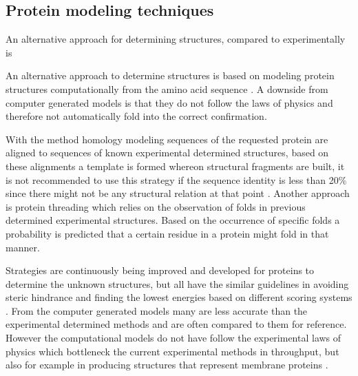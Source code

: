 \subsection{Protein modeling techniques}
An alternative approach for determining structures, compared to experimentally is  

An alternative approach to determine structures is based on modeling protein structures computationally from the amino acid sequence . A downside from computer generated models is that they do not follow the laws of physics and therefore not automatically fold into the correct confirmation. 

With the method homology modeling sequences of the requested protein are aligned to sequences of known experimental determined structures, based on these alignments a template is formed whereon structural fragments are built, it is not recommended to use this strategy if the sequence identity is less than 20\% since there might not be any structural relation at that point \cite{chothia_relation_1986}.
Another approach is protein threading which relies on the observation of folds in previous determined experimental structures. Based on the occurrence of specific folds a probability is predicted that a certain residue in a protein might fold in that manner. 

Strategies are continuously being improved and developed for proteins to determine the unknown structures, but all have the similar guidelines in avoiding steric hindrance \cite{yonath_x-ray_2011} and finding the lowest energies based on different scoring systems \cite{wikipedia_ramachandran_2019}. From the computer generated models many are less accurate than the experimental determined methods and are often compared to them for reference. However the computational models do not have follow the experimental laws of physics which bottleneck the current experimental methods in throughput, but also for example in producing structures that represent membrane proteins \cite{shourya_scoring_nodate}.
\label{subsec:GD_Protein_modeling_techniques}

